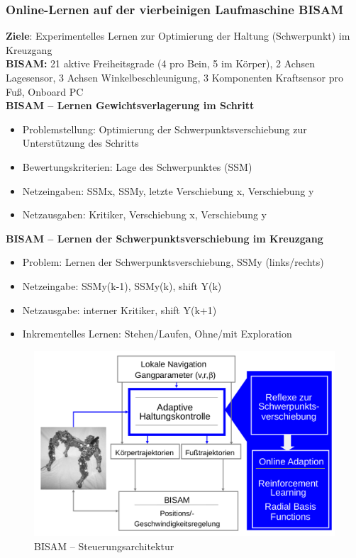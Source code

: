 \subsubsection{Online-Lernen auf der vierbeinigen Laufmaschine BISAM}
\textbf{Ziele}:
Experimentelles Lernen zur Optimierung der Haltung (Schwerpunkt) im Kreuzgang\\
\textbf{BISAM:}
21 aktive Freiheitsgrade (4 pro Bein, 5 im Körper), 2 Achsen Lagesensor, 3 Achsen Winkelbeschleunigung, 3 Komponenten Kraftsensor pro Fuß, Onboard PC\\
%
\textbf{BISAM -- Lernen Gewichtsverlagerung im Schritt}
\begin{itemize}
	\item Problemstellung: Optimierung der Schwerpunktsverschiebung zur Unterstützung des Schritts
	\item Bewertungskriterien: Lage des Schwerpunktes (SSM)
	\item Netzeingaben: SSMx, SSMy, letzte Verschiebung x, Verschiebung y
	\item Netzausgaben: Kritiker, Verschiebung x, Verschiebung y
\end{itemize}
\textbf{BISAM -- Lernen der Schwerpunktsverschiebung im Kreuzgang}
\begin{itemize}
	\item Problem: Lernen der Schwerpunktsverschiebung, SSMy (links/rechts)
	\item Netzeingabe: SSMy(k-1), SSMy(k), shift Y(k)
	\item Netzausgabe: interner Kritiker, shift Y(k+1)
	\item Inkrementelles Lernen: Stehen/Laufen, Ohne/mit Exploration
\end{itemize}

\begin{figure}
	\centering
	\includegraphics[width=\textwidth]{figures/bisam_steuerungsarchitektur.png}
	\caption{BISAM -- Steuerungsarchitektur}
\end{figure}


